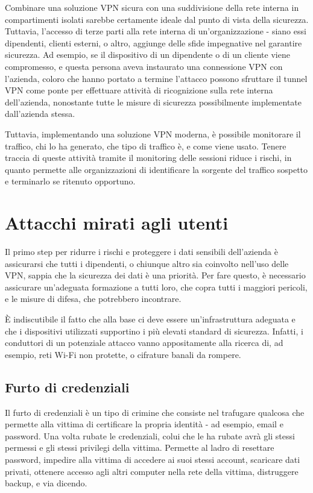 Combinare una soluzione VPN sicura con una suddivisione della rete interna in compartimenti isolati sarebbe certamente ideale dal punto di vista della sicurezza.
Tuttavia, l'accesso di terze parti alla rete interna di un'organizzazione - siano essi dipendenti, clienti esterni, o altro, aggiunge delle sfide impegnative nel garantire sicurezza.
Ad esempio, se il dispositivo di un dipendente o di un cliente viene compromesso, e questa persona aveva instaurato una connessione VPN con l'azienda, coloro che hanno portato a termine l'attacco possono sfruttare il tunnel VPN come ponte per effettuare attività di ricognizione sulla rete interna dell'azienda, nonostante tutte le misure di sicurezza possibilmente implementate dall'azienda stessa.

Tuttavia, implementando una soluzione VPN moderna, è possibile monitorare il traffico, chi lo ha generato, che tipo di traffico è, e come viene usato. Tenere traccia di queste attività tramite il monitoring delle sessioni riduce i rischi, in quanto permette alle organizzazioni di identificare la sorgente del traffico sospetto e terminarlo se ritenuto opportuno.

\section{Attacchi mirati agli utenti}

Il primo step per ridurre i rischi e proteggere i dati sensibili dell'azienda è assicurarsi che tutti i dipendenti, o chiunque altro sia coinvolto nell'uso delle VPN, sappia che la sicurezza dei dati è una priorità.
Per fare questo, è necessario assicurare un'adeguata formazione a tutti loro, che copra tutti i maggiori pericoli, e le misure di difesa, che potrebbero incontrare.

È indiscutibile il fatto che alla base ci deve essere un'infrastruttura adeguata e che i dispositivi utilizzati supportino i più elevati standard di sicurezza. Infatti, i conduttori di un potenziale attacco vanno appositamente alla ricerca di, ad esempio, reti Wi-Fi non protette, o cifrature banali da rompere.

\subsection{Furto di credenziali}
Il furto di credenziali è un tipo di crimine che consiste nel trafugare qualcosa che permette alla vittima di certificare la propria identità - ad esempio, email e password.
Una volta rubate le credenziali, colui che le ha rubate avrà gli stessi permessi e gli stessi privilegi della vittima.
Permette al ladro di resettare password, impedire alla vittima di accedere ai suoi stessi account, scaricare dati privati, ottenere accesso agli altri computer nella rete della vittima, distruggere backup, e via dicendo.

